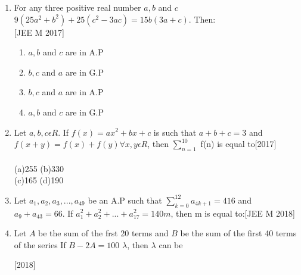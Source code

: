 \documentclass[journal,12pt,twocolumn]{IEEEtran}
\theoremstyle{remark}
\begin{document}
\begin{enumerate}
 \item{For any three positive real number $a,b$ and $c$ $9(25a^2+b^2)+ 25(c^2-3ac) = 15b(3a+c)$. Then:\\ \null \hfill{[JEE M 2017]}\begin{multicols}{2}
	 \begin{enumerate}\itemsep.5em
  \item{$a,b$ and $c$ are in A.P}
  \item{$b,c$ and $a$ are in G.P}
  \columnbreak
  \item{$b,c$ and $a$ are in A.P}
  \item{$a,b$ and $c$ are in G.P}
  \end{enumerate}
  \end{multicols}}
  \item{Let $a,b,c\epsilon R$. If $f(x)=ax^2+bx+c$ is such that $a+b+c=3$ and $f(x+y)=f(x)+f(y) \forall x,y \epsilon R$, then $\sum _{n=1}^{10}$  f(n)  is  equal  to\hfill{[2017]}\\\\(a)255 \hspace{2cm}(b)330\\(c)165 \hspace{2cm}(d)190} 
  \item{Let $a_{1},a_{2},a_{3},...,a_{49}$ be an A.P such that $\sum_{k=0}^{12} a_{4k+1}=416$ and $a_{9}+a_{43}=66$. If $a_{1}^2+ a_{2}^{2}+...+a_{17}^{2}=140m$, then m is equal to:\hfill{[JEE M 2018]}\begin{enumerate}
  \end{enumerate}}
  \item{Let $A$ be the sum of the frst 20 terms and $B$ be the sum of the first 40 terms of the series  If $B-2A=100$ $\lambda$, then $\lambda$ can be\hfill{[2018]\begin{enumerate}

\end{enumerate}}}
\end{enumerate}
\end{document}
